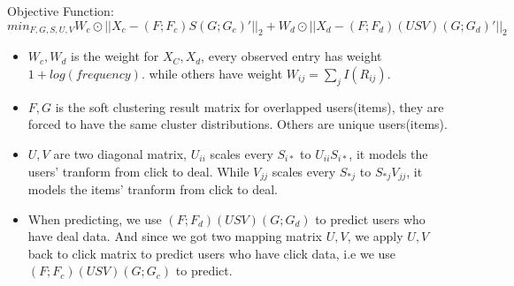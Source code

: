   \par{Objective Function:$$min_{F,G,S,U,V} W_c\odot ||X_c - (F;F_c)S(G;G_c)'||_2 + W_d\odot ||X_d - (F;F_d)(USV)(G;G_d)'||_2 $$}

  \par{
    \begin{itemize}
    \item $W_c,W_d$ is the weight for $X_C, X_d$, every observed entry has weight $1 + log(frequency)$. while others have weight $W_{ij} = \sum_jI({R_{ij}})$.
    \item $F, G$ is the soft clustering result matrix for overlapped users(items), they are forced to have the same cluster distributions. Others are unique users(items).
    \item $U,V$ are two diagonal matrix, $U_{ii}$ scales every $S_{i*}$ to $U_{ii}S_{i*}$, it models the users' tranform from click to deal. While $V_{jj}$ scales every $S_{*j}$ to $S_{*j}V_{jj}$, it models the items' tranform from click to deal.
    \item When predicting, we use $(F;F_d)(USV)(G;G_d)$ to predict users who have deal data. And since we got two mapping matrix $U,V$, we apply $U,V$ back to click matrix to predict users who have click data, i.e we use $(F;F_c)(USV)(G;G_c)$ to predict.
    \end{itemize}
}



